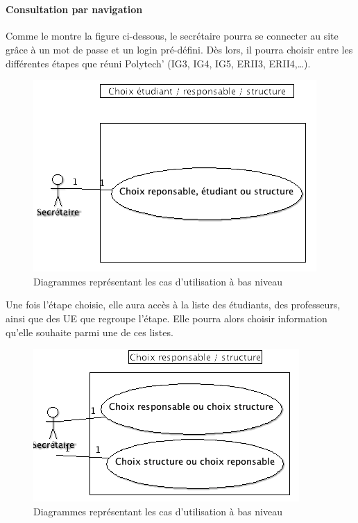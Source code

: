 \documentclass[letter, 11pt] {article}
\begin{document}
~\\
\paragraph{Consultation par navigation}
Comme le montre la figure ci-dessous, le secrétaire pourra se connecter au site grâce à un mot de passe et un login pré-défini. Dès lors, il pourra choisir entre les différentes étapes que réuni Polytech’ (IG3, IG4, IG5, ERII3, ERII4,…).


				\begin{figure}[!h]\centering
\includegraphics[scale = 0.5]{../UseCase/UseCaseBasNiveau/ChoixEtudiantResponsableStructure.png}
				\caption{Diagrammes représentant les cas d'utilisation à bas niveau}\end{figure}
			
				Une fois l'étape choisie, elle aura accès à la liste des étudiants, des professeurs, ainsi que des UE que regroupe l'étape. Elle pourra alors choisir information qu'elle souhaite parmi une de ces listes.



			\begin{figure}[!h]
\centering	\includegraphics[scale = 0.65]
{../UseCase/UseCaseBasNiveau/ChoixResponsableStructure.png}
				\caption{Diagrammes représentant les cas d'utilisation à bas niveau}\end{figure}
\end{document}
